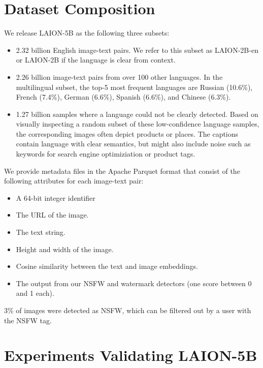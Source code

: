 \section{Dataset Composition}
\label{sec:dataset_composition}

We release LAION-5B as the following three subsets:

\begin{itemize}
    \item 2.32 billion English image-text pairs. We refer to this subset as LAION-2B-en or LAION-2B if the language is clear from context.
    \item 2.26 billion image-text pairs from over 100 other languages. In the multilingual subset, the top-5 most frequent languages are Russian (10.6\%), French (7.4\%), German (6.6\%), Spanish (6.6\%), and Chinese (6.3\%).
    \item 1.27 billion samples where a language could not be clearly detected. Based on visually inspecting a random subset of these low-confidence language samples, the corresponding images often depict products or places. The captions contain language with clear semantics, but might also include noise such as keywords for search engine optimiziation or product tags.
\end{itemize}

We provide metadata files in the Apache Parquet format that consist of the following attributes for each image-text pair:

\begin{itemize}[nosep]
    \item A 64-bit integer identifier \item The URL of the image. 
    \item The text string.
    \item Height and width of the image. 
    \item Cosine similarity between the text and image embeddings.
    \item The output from our NSFW and watermark detectors (one score between 0 and 1 each).
\end{itemize}

3\% of images were detected as NSFW, which can be filtered out by a user with the NSFW tag.

\section{Experiments Validating LAION-5B}
\label{sec:experiments}

